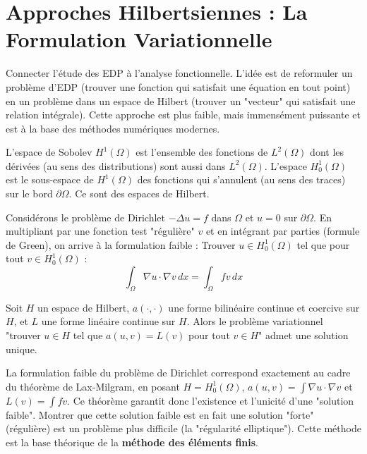 \section{Approches Hilbertsiennes : La Formulation Variationnelle}

\begin{objectif}
    Connecter l'étude des EDP à l'analyse fonctionnelle. L'idée est de reformuler un problème d'EDP (trouver une fonction qui satisfait une équation en tout point) en un problème dans un espace de Hilbert (trouver un "vecteur" qui satisfait une relation intégrale). Cette approche est plus faible, mais immensément puissante et est à la base des méthodes numériques modernes.
\end{objectif}

\begin{definition}
    L'espace de Sobolev $H^1(\Omega)$ est l'ensemble des fonctions de $L^2(\Omega)$ dont les dérivées (au sens des distributions) sont aussi dans $L^2(\Omega)$.
    L'espace $H_0^1(\Omega)$ est le sous-espace de $H^1(\Omega)$ des fonctions qui s'annulent (au sens des traces) sur le bord $\partial \Omega$. Ce sont des espaces de Hilbert.
\end{definition}

\begin{proposition}
    Considérons le problème de Dirichlet $-\Delta u = f$ dans $\Omega$ et $u=0$ sur $\partial \Omega$. En multipliant par une fonction test "régulière" $v$ et en intégrant par parties (formule de Green), on arrive à la formulation faible :
    Trouver $u \in H_0^1(\Omega)$ tel que pour tout $v \in H_0^1(\Omega)$ :
    $$ \int_\Omega \nabla u \cdot \nabla v \, dx = \int_\Omega f v \, dx $$
\end{proposition}

\begin{theorem}
    Soit $H$ un espace de Hilbert, $a(\cdot, \cdot)$ une forme bilinéaire continue et coercive sur $H$, et $L$ une forme linéaire continue sur $H$. Alors le problème variationnel "trouver $u \in H$ tel que $a(u,v)=L(v)$ pour tout $v \in H$" admet une solution unique.
\end{theorem}

\begin{application}
    La formulation faible du problème de Dirichlet correspond exactement au cadre du théorème de Lax-Milgram, en posant $H=H_0^1(\Omega)$, $a(u,v)=\int \nabla u \cdot \nabla v$ et $L(v)=\int fv$. Ce théorème garantit donc l'existence et l'unicité d'une "solution faible". Montrer que cette solution faible est en fait une solution "forte" (régulière) est un problème plus difficile (la "régularité elliptique"). Cette méthode est la base théorique de la \textbf{méthode des éléments finis}.
\end{application}